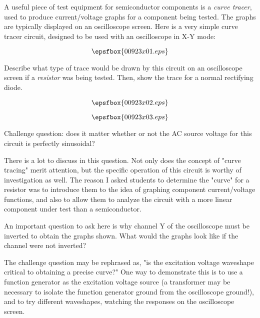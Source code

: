 

A useful piece of test equipment for semiconductor components is a {\it curve tracer}, used to produce current/voltage graphs for a component being tested.  The graphs are typically displayed on an oscilloscope screen.  Here is a very simple curve tracer circuit, designed to be used with an oscilloscope in X-Y mode:

$$\epsfbox{00923x01.eps}$$

Describe what type of trace would be drawn by this circuit on an oscilloscope screen if a {\it resistor} was being tested.  Then, show the trace for a normal rectifying diode.







$$\epsfbox{00923x02.eps}$$

\vskip 10pt

$$\epsfbox{00923x03.eps}$$

\vskip 10pt

Challenge question: does it matter whether or not the AC source voltage for this circuit is perfectly sinusoidal?







There is a lot to discuss in this question.  Not only does the concept of "curve tracing" merit attention, but the specific operation of this circuit is worthy of investigation as well.  The reason I asked students to determine the "curve" for a resistor was to introduce them to the idea of graphing component current/voltage functions, and also to allow them to analyze the circuit with a more linear component under test than a semiconductor.

An important question to ask here is why channel Y of the oscilloscope must be inverted to obtain the graphs shown.  What would the graphs look like if the channel were not inverted?

The challenge question may be rephrased as, "is the excitation voltage waveshape critical to obtaining a precise curve?"  One way to demonstrate this is to use a function generator as the excitation voltage source (a transformer may be necessary to isolate the function generator ground from the oscilloscope ground!), and to try different waveshapes, watching the responses on the oscilloscope screen.




